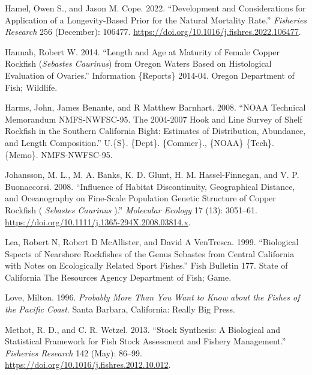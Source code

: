 \documentclass[11pt,
  english,
  letterpaper,
]{article}
\newlength{\cslhangindent}
\newenvironment{CSLReferences}[2] %
 {%
  \setlength{\parindent}{0pt}
  \ifodd #1 \everypar{\setlength{\hangindent}{\cslhangindent}}\ignorespaces\fi
  \ifnum #2 > 0
  \setlength{\parskip}{#2\baselineskip}
  \fi
 }%
 {}
\begin{document}
\begin{CSLReferences}{1}{0}
\leavevmode{}%
Hamel, Owen S., and Jason M. Cope. 2022. {``Development and Considerations for Application of a Longevity-Based Prior for the Natural Mortality Rate.''} \emph{Fisheries Research} 256 (December): 106477. \url{https://doi.org/10.1016/j.fishres.2022.106477}.

\leavevmode{}%
Hannah, Robert W. 2014. {``Length and Age at Maturity of Female Copper Rockfish (\emph{{Sebastes} Caurinus}) from {Oregon} Waters Based on Histological Evaluation of Ovaries.''} Information \{Reports\} 2014-04. Oregon Department of Fish; Wildlife.

\leavevmode{}%
Harms, John, James Benante, and R Matthew Barnhart. 2008. {``{NOAA} {Technical} {Memorandum} {NMFS}-{NWFSC}-95. {The} 2004-2007 {Hook} and {Line} {Survey} of {Shelf} {Rockfish} in the {Southern} {California} {Bight}: {Estimates} of {Distribution}, {Abundance}, and {Length} {Composition}.''} U.\{S\}. \{Dept\}. \{Commer\}., \{NOAA\} \{Tech\}. \{Memo\}. NMFS-NWFSC-95.

\leavevmode{}%
Johansson, M. L., M. A. Banks, K. D. Glunt, H. M. Hassel-Finnegan, and V. P. Buonaccorsi. 2008. {``Influence of Habitat Discontinuity, Geographical Distance, and Oceanography on Fine-Scale Population Genetic Structure of Copper Rockfish ( \emph{{Sebastes} Caurinus} ).''} \emph{Molecular Ecology} 17 (13): 3051--61. \url{https://doi.org/10.1111/j.1365-294X.2008.03814.x}.

\leavevmode{}%
Lea, Robert N, Robert D McAllister, and David A VenTresca. 1999. {``Biological Sspects of Nearshore Rockfishes of the Genus Sebastes from {Central} {California} with Notes on Ecologically Related Sport Fishes.''} Fish Bulletin 177. State of California The Resources Agency Department of Fish; Game.

\leavevmode{}%
Love, Milton. 1996. \emph{Probably More Than You Want to Know about the Fishes of the {Pacific} {Coast}}. Santa Barbara, California: Really Big Press.

\leavevmode{}%
Methot, R. D., and C. R. Wetzel. 2013. {``Stock Synthesis: A Biological and Statistical Framework for Fish Stock Assessment and Fishery Management.''} \emph{Fisheries Research} 142 (May): 86--99. \url{https://doi.org/10.1016/j.fishres.2012.10.012}.


\end{CSLReferences}
\end{document}
